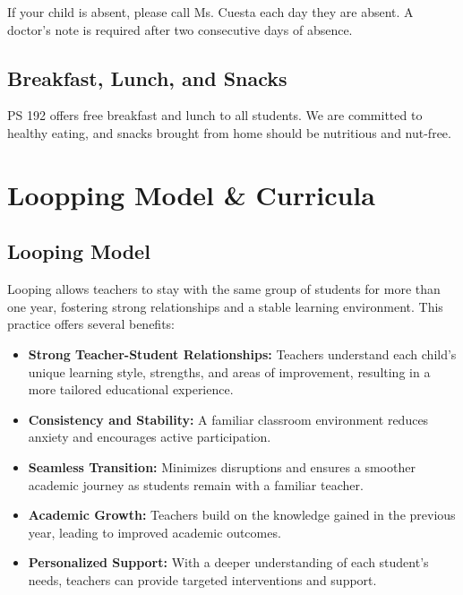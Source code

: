 \documentclass[11pt]{article}
\begin{document}
If your child is absent, please call Ms. Cuesta each day they are absent. A doctor's note is required after two consecutive days of absence.

\subsection{Breakfast, Lunch, and Snacks}
\label{sec:orga447bd3}
PS 192 offers free breakfast and lunch to all students. We are committed to healthy eating, and snacks brought from home should be nutritious and nut-free.

\section{Loopping Model \& Curricula}
\label{sec:org6007cb7}

\subsection{Looping Model}
\label{sec:org496d7e7}
Looping allows teachers to stay with the same group of students for more than one year, fostering strong relationships and a stable learning environment. This practice offers several benefits:
\begin{itemize}
\item \textbf{\textbf{Strong Teacher-Student Relationships:}} Teachers understand each child’s unique learning style, strengths, and areas of improvement, resulting in a more tailored educational experience.
\item \textbf{\textbf{Consistency and Stability:}} A familiar classroom environment reduces anxiety and encourages active participation.
\item \textbf{\textbf{Seamless Transition:}} Minimizes disruptions and ensures a smoother academic journey as students remain with a familiar teacher.
\item \textbf{\textbf{Academic Growth:}} Teachers build on the knowledge gained in the previous year, leading to improved academic outcomes.
\item \textbf{\textbf{Personalized Support:}} With a deeper understanding of each student’s needs, teachers can provide targeted interventions and support.
\end{itemize}
\end{document}

